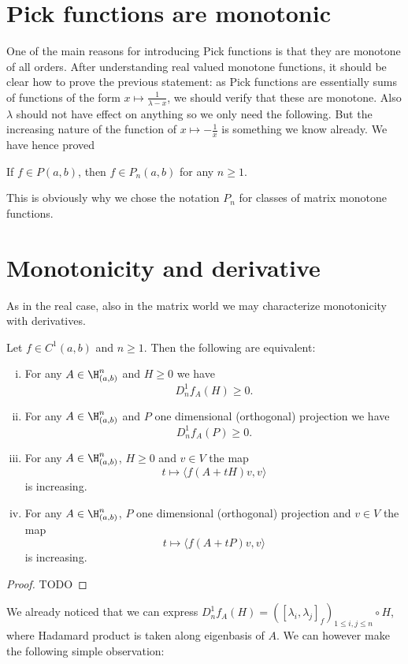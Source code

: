 \section{Pick functions are monotonic}
One of the main reasons for introducing Pick functions is that they are monotone of all orders. After understanding real valued monotone functions, it should be clear how to prove the previous statement: as Pick functions are essentially sums of functions of the form $x \mapsto \frac{1}{\lambda - x}$, we should verify that these are monotone. Also $\lambda$ should not have effect on anything so we only need the following. But the increasing nature of the function of $x \mapsto -\frac{1}{x}$ is something we know already. We have hence proved 
\begin{lause}
	If $f \in P(a, b)$, then $f \in P_{n}(a, b)$ for any $n \geq 1$.
\end{lause}
This is obviously why we chose the notation $P_{n}$ for classes of matrix monotone functions.

\section{Monotonicity and derivative}

As in the real case, also in the matrix world we may characterize monotonicity with derivatives.

\begin{lause}
	Let $f \in C^{1}(a, b)$ and $n \geq 1$. Then the following are equivalent:
	\begin{enumerate}[(i)]
	\item For any $A \in \H^{n}_{(a, b)}$ and $H \geq 0$ we have
	\[
		D^{1}_{n}f_{A}(H) \geq 0.
	\]
	\item For any $A \in \H^{n}_{(a, b)}$ and $P$ one dimensional (orthogonal) projection we have
	\[
		D^{1}_{n}f_{A}(P) \geq 0.
	\]
	\item For any $A \in \H^{n}_{(a, b)}$, $H \geq 0$ and $v \in V$ the map
	\[
		t \mapsto \langle f(A + t H) v, v \rangle
	\]
	is increasing.
	\item For any $A \in \H^{n}_{(a, b)}$, $P$ one dimensional (orthogonal) projection and $v \in V$ the map
	\[
		t \mapsto \langle f(A + t P) v, v \rangle
	\]
	is increasing.
	\end{enumerate}
\end{lause}
\begin{proof}
	TODO
\end{proof}

We already noticed that we can express $D^{1}_{n}f_{A}(H) = ([\lambda_{i}, \lambda_{j}]_{f})_{1 \leq i, j \leq n}\circ H$, where Hadamard product is taken along eigenbasis of $A$. We can however make the following simple observation:

